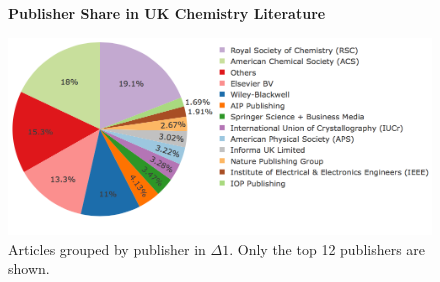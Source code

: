 \begin{figure}[H]
    \centering
    \textbf{Publisher Share in UK Chemistry Literature}\par\medskip
    \includegraphics[width=\textwidth]{Data_Acquisition/uk_publishers_pie.png}
    \caption[Publisher Share in UK Chemistry Literature]{Articles grouped by publisher in $\Delta1$. Only the top 12 publishers are shown.}
     \label{fig:UKPUBPI}
\end{figure}

